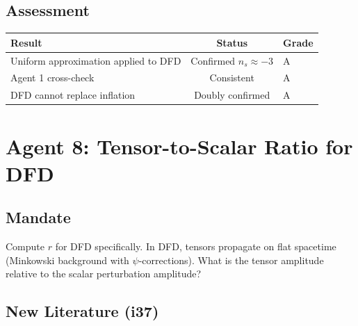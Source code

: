 \documentclass[11pt,a4paper]{article}
\begin{document}
\subsection{Assessment}

\begin{center}
\begin{tabular}{lcl}
\toprule
\textbf{Result} & \textbf{Status} & \textbf{Grade} \\
\midrule
Uniform approximation applied to DFD & Confirmed $n_s \approx -3$ & A \\
Agent 1 cross-check & Consistent & A \\
DFD cannot replace inflation & Doubly confirmed & A \\
\bottomrule
\end{tabular}
\end{center}

\newpage
\section{Agent 8: Tensor-to-Scalar Ratio for DFD}
\label{sec:agent8}

\subsection{Mandate}

Compute $r$ for DFD specifically. In DFD, tensors propagate on flat spacetime (Minkowski background with $\psi$-corrections). What is the tensor amplitude relative to the scalar perturbation amplitude?

\subsection{New Literature (i37)}
\end{document}
